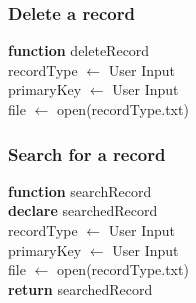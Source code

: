 \documentclass[12pt,a4paper]{article}
\begin{document}
        \subsubsection{Delete a record}
            \IncMargin{1em}
                \begin{algorithm}[H]
                    \SetAlgoLined
                    \textbf{function} deleteRecord \\
                    recordType $\leftarrow$ User Input \\
                    primaryKey $\leftarrow$ User Input \\
                    file $\leftarrow$ open(recordType.txt) \\
                    
                \end{algorithm}
            \DecMargin{1em}
        \subsubsection{Search for a record}
            \IncMargin{1em}
                \begin{algorithm}[H]
                    \SetAlgoLined
                    \textbf{function} searchRecord \\
                    \textbf{declare} searchedRecord \\
                    recordType $\leftarrow$ User Input \\
                    primaryKey $\leftarrow$ User Input \\
                    file $\leftarrow$ open(recordType.txt) \\
                    \textbf{return} searchedRecord
                     
                \end{algorithm}
            \DecMargin{1em}
\end{document}
